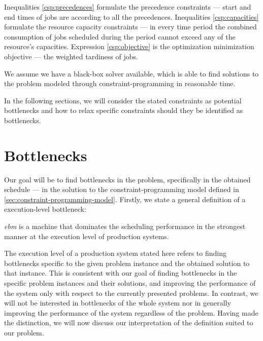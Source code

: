 Inequalities \eqref{csp:precedences} formulate the precedence constraints --- start and end times of jobs
are according to all the precedences.
Inequalities \eqref{csp:capacities} formulate the resource capacity constraints --- in every time period
the combined consumption of jobs scheduled during the period cannot exceed any of the resource's capacities.
Expression \eqref{csp:objective} is the optimization minimization objective --- the weighted tardiness of jobs.

We assume we have a black-box solver available,
which is able to find solutions to the problem modeled through constraint-programming in reasonable time.

In the following sections, we will consider the stated constraints as potential bottlenecks
and how to relax specific constraints should they be identified as bottlenecks.

\section{Bottlenecks} \label{sec:bottlenecks}

Our goal will be to find bottlenecks in the problem, specifically in the obtained schedule
--- in the solution to the constraint-programming model defined in \cref{sec:constraint-programming-model}.
Firstly, we state a general definition of a execution-level bottleneck:

\begin{defn*}\label{def:bottleneck}
    \emph{\ac{ebm}} is a machine that dominates the scheduling performance in the strongest manner
    at the execution level of production systems.
\end{defn*}

The execution level of a production system stated here refers to finding bottlenecks
specific to the given problem instance and the obtained solution to that instance.
This is consistent with our goal of finding bottlenecks in the specific problem instances and their solutions,
and improving the performance of the system only with respect to the currently presented problems.
In contrast, we will not be interested in bottlenecks of the whole system
nor in generally improving the performance of the system regardless of the problem.
Having made the distinction, we will now discuss our interpretation of the definition suited to our problem.

